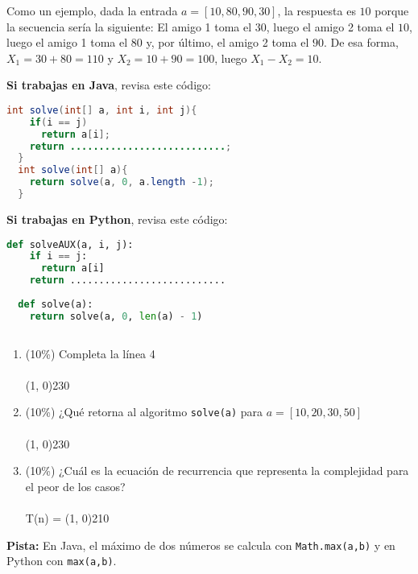 \documentclass[10 pt]{article}
\begin{document}
  Como un ejemplo, dada la entrada $a = [10, 80, 90, 30]$, la respuesta es $10$ porque la secuencia sería la siguiente: El amigo 1 toma el $30$, luego el amigo 2 toma el $10$, luego el amigo 1 toma el $80$ y, por último, el amigo 2 toma el $90$. De esa forma, $X_1 = 30 + 80 = 110$ y $X_2 = 10 + 90 = 100$, luego $X_1 - X_2 = 10$.

\hspace{1cm}

\textbf{Si trabajas en Java}, revisa este código:

  \begin{lstlisting}[language=Java]
  int solve(int[] a, int i, int j){
    if(i == j) 
      return a[i];
    return ...........................;
  }
  int solve(int[] a){
    return solve(a, 0, a.length -1); 
  }
  \end{lstlisting}


\textbf{Si trabajas en Python}, revisa este código:

  \begin{lstlisting}[language=Python]
  def solveAUX(a, i, j):
    if i == j: 
      return a[i]
    return ...........................
  
  def solve(a):
    return solve(a, 0, len(a) - 1)
  
  \end{lstlisting}



  \begin{enumerate}[label=(\Alph*)]
    \item (10\%) Completa la línea 4 \\ \\
    \line(1, 0){230} 
    \item (10\%) ¿Qué retorna al algoritmo \texttt{solve(a)} para $a = [10,20,30,50]$ \\ \\
    \line(1, 0){230} 
    \item (10\%) ¿Cuál es la ecuación de recurrencia que representa la complejidad para el peor de los casos?\\ \\
    T(n) = \line(1, 0){210} 
  \end{enumerate}

\textbf{Pista:} En Java, el máximo de dos números se calcula con \texttt{Math.max(a,b)} y en Python con \texttt{max(a,b)}.
\end{document}
